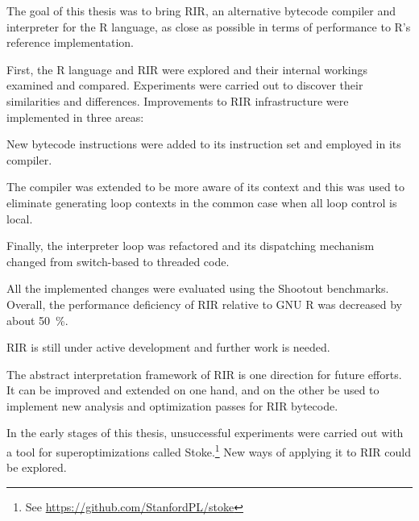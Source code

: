 The goal of this thesis was to bring RIR, an alternative bytecode compiler and interpreter for the R language, as close as possible in terms of performance to R's reference implementation.

First, the R language and RIR were explored and their internal workings examined and compared. Experiments were carried out to discover their similarities and differences. Improvements to RIR infrastructure were implemented in three areas:

New bytecode instructions were added to its instruction set and employed in its compiler.

The compiler was extended to be more aware of its context and this was used to eliminate generating loop contexts in the common case when all loop control is local.

Finally, the interpreter loop was refactored and its dispatching mechanism changed from switch-based to threaded code.

All the implemented changes were evaluated using the Shootout benchmarks. Overall, the performance deficiency of RIR relative to GNU R was decreased by about 50~\%.

RIR is still under active development and further work is needed. 

The abstract interpretation framework of RIR is one direction for future efforts. It can be improved and extended on one hand, and on the other be used to implement new analysis and optimization passes for RIR bytecode.

In the early stages of this thesis, unsuccessful experiments were carried out with a tool for superoptimizations called Stoke.\footnote{See \url{https://github.com/StanfordPL/stoke}} New ways of applying it to RIR could be explored.

